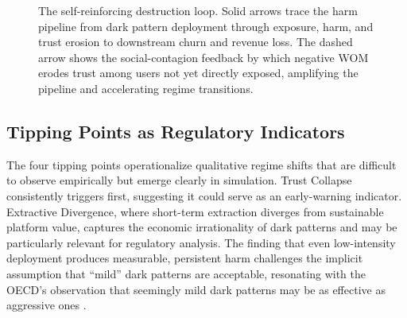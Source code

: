 \documentclass[a4paper,fleqn]{cas-sc}
\begin{document}
\begin{figure}[pos=htbp]
\centering
{}
\caption{The self-reinforcing destruction loop. Solid arrows trace the harm pipeline from dark pattern deployment through exposure, harm, and trust erosion to downstream churn and revenue loss. The dashed arrow shows the social-contagion feedback by which negative WOM erodes trust among users not yet directly exposed, amplifying the pipeline and accelerating regime transitions.}
\label{fig:loop}
\end{figure}

\subsection{Tipping Points as Regulatory Indicators}
The four tipping points operationalize qualitative regime shifts that are difficult to observe empirically but emerge clearly in simulation. Trust Collapse consistently triggers first, suggesting it could serve as an early-warning indicator. Extractive Divergence, where short-term extraction diverges from sustainable platform value, captures the economic irrationality of dark patterns and may be particularly relevant for regulatory analysis. The finding that even low-intensity deployment produces measurable, persistent harm challenges the implicit assumption that ``mild'' dark patterns are acceptable, resonating with the OECD's observation that seemingly mild dark patterns may be as effective as aggressive ones \citep{oecd2022}.
\end{document}
